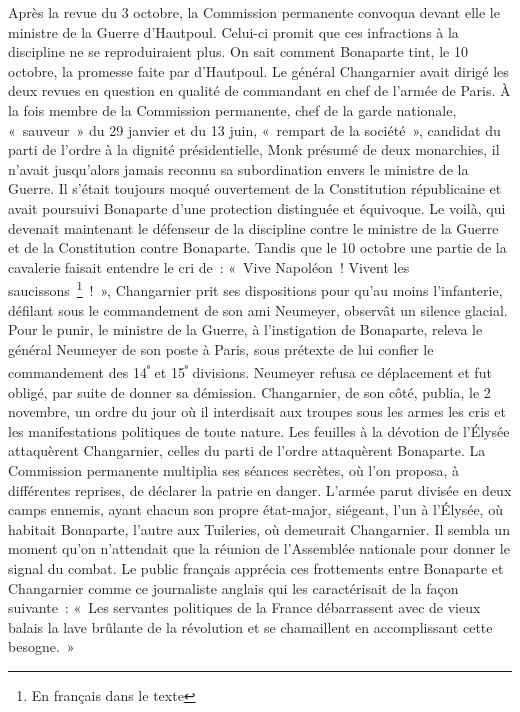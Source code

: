 \documentclass[french,twoside]{book} %
\begin{document}
Après la revue du 3 octobre, la Commission permanente convoqua devant elle le ministre de la Guerre d’Hautpoul. Celui-ci promit que ces infractions à la discipline ne se reproduiraient plus. On sait comment Bonaparte tint, le 10 octobre, la promesse faite par d’Hautpoul. Le général Changarnier avait dirigé les deux revues en question en qualité de commandant en chef de l’armée de Paris. À la fois membre de la Commission permanente, chef de la garde nationale, « sauveur » du 29 janvier et du 13 juin, « rempart de la société », candidat du parti de l’ordre à la dignité présidentielle, Monk présumé de deux monarchies, il n’avait jusqu’alors jamais reconnu sa subordination envers le ministre de la Guerre. Il s’était toujours moqué ouvertement de la Constitution républicaine et avait poursuivi Bonaparte d’une protection distinguée et équivoque. Le voilà, qui devenait maintenant le défenseur de la discipline contre le ministre de la Guerre et de la Constitution contre Bonaparte. Tandis que le 10 octobre une partie de la cavalerie faisait entendre le cri de : « Vive Napoléon ! Vivent les saucissons \footnote{En français dans le texte} ! », Changarnier prit ses dispositions pour qu’au moins l’infanterie, défilant sous le commandement de son ami Neumeyer, observât un silence glacial. Pour le punir, le ministre de la Guerre, à l’instigation de Bonaparte, releva le général Neumeyer de son poste à Paris, sous prétexte de lui confier le commandement des 14\textsuperscript{ᵉ} et 15\textsuperscript{ᵉ} divisions. Neumeyer refusa ce déplacement et fut obligé, par suite de donner sa démission. Changarnier, de son côté, publia, le 2 novembre, un ordre du jour où il interdisait aux troupes sous les armes les cris et les manifestations politiques de toute nature. Les feuilles à la dévotion de l’Élysée attaquèrent Changarnier, celles du parti de l’ordre attaquèrent Bonaparte. La Commission permanente multiplia ses séances secrètes, où l’on proposa, à différentes reprises, de déclarer la patrie en danger. L’armée parut divisée en deux camps ennemis, ayant chacun son propre état-major, siégeant, l’un à l’Élysée, où habitait Bonaparte, l’autre aux Tuileries, où demeurait Changarnier. Il sembla un moment qu’on n’attendait que la réunion de l’Assemblée nationale pour donner le signal du combat. Le public français apprécia ces frottements entre Bonaparte et Changarnier comme ce journaliste anglais qui les caractérisait de la façon suivante : « Les servantes politiques de la France débarrassent avec de vieux balais la lave brûlante de la révolution et se chamaillent en accomplissant cette besogne. »\par
\end{document}
